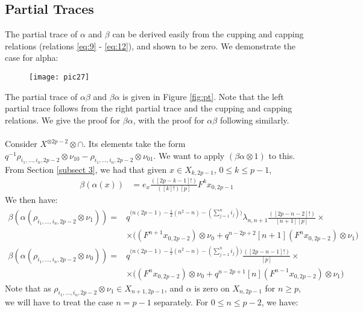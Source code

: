 \documentclass[]{article}
\begin{document}
\subsection{Partial Traces}
The partial trace of $\alpha$ and $\beta$ can be derived easily from the cupping and capping relations (relations \ref{eq:9} - \ref{eq:12}), and shown to be zero. We demonstrate the case for alpha:
\begin{figure}[H]
	\centering
	\texttt{[image: pic27]}
\end{figure}
The partial trace of $\alpha\beta$ and $\beta\alpha$ is given in Figure \ref{fig:pt}. Note that the left partial trace follows from the right partial trace and the cupping and capping relations. We give the proof for $\beta\alpha$, with the proof for $\alpha\beta$ following similarly.\\
\\
Consider $X^{\otimes 2p-2}\otimes\cap$. Its elements take the form $q^{-1}\rho_{i_{1},...,i_{n},2p-2}\otimes\nu_{10}-\rho_{i_{1},...,i_{n},2p-2}\otimes\nu_{01}$. We want to apply $(\beta\alpha\otimes 1)$ to this. From Section \ref{subsect 3}, we had that given $x\in X_{k,2p-1}$, $0\leq k\leq p-1$,
\begin{align*}
\beta(\alpha(x))&=e_{x}\frac{([2p-k-1]!)}{([k]!)[p]}F^{k}x_{0,2p-1}
\end{align*}
We then have:
\begin{align*}
\beta(\alpha(\rho_{i_{1},...,i_{n},2p-2}\otimes\nu_{1}))=& q^{\big(n(2p-1)-\frac{1}{2}(n^{2}-n)-(\sum\limits_{j=1}^{n}i_{j})\big)}\lambda_{n,n+1}\frac{([2p-n-2]!)}{[n+1][p]}\times\\
&\times\bigg((F^{n+1}x_{0,2p-2})\otimes\nu_{0}+q^{n-2p+2}[n+1](F^{n}x_{0,2p-2})\otimes\nu_{1}\bigg)\\
\beta(\alpha(\rho_{i_{1},...,i_{n},2p-2}\otimes\nu_{0}))=& q^{\big(n(2p-1)-\frac{1}{2}(n^{2}-n)-(\sum\limits_{j=1}^{n}i_{j})\big)}\frac{([2p-n-1]!)}{[p]}\times\\
&\times\bigg((F^{n}x_{0,2p-2})\otimes\nu_{0}+q^{n-2p+1}[n](F^{n-1}x_{0,2p-2})\otimes\nu_{1}\bigg)
\end{align*}
Note that as $\rho_{i_{1},...,i_{n},2p-2}\otimes\nu_{1}\in X_{n+1,2p-1}$, and $\alpha$ is zero on $X_{n,2p-1}$ for $n\geq p$, we will have to treat the case $n=p-1$ separately. For $0\leq n\leq p-2$, we have:\\ 
\end{document}
